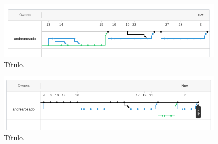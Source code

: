 \begin{figure}
\begin{center}
\includegraphics[width=\textwidth]{ResultadosyDiscusion/Figs/network-1.png}
\caption{Título. \label{fig:network1}}
\end{center}
\end{figure}

\begin{figure}
\begin{center}
\includegraphics[width=\textwidth]{ResultadosyDiscusion/Figs/network-2.png}
\caption{Título. \label{fig:network2}}
\end{center}
\end{figure}

